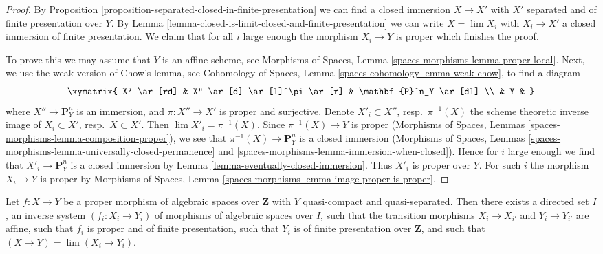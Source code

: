 \begin{proof}
By Proposition \ref{proposition-separated-closed-in-finite-presentation}
we can find a closed immersion $X \to X'$ with $X'$ separated and of
finite presentation over $Y$. By
Lemma \ref{lemma-closed-is-limit-closed-and-finite-presentation}
we can write $X = \lim X_i$ with $X_i \to X'$ a closed immersion of
finite presentation. We claim that for all $i$ large enough
the morphism $X_i \to Y$ is proper which finishes the proof.

\medskip\noindent
To prove this we may assume that $Y$ is an affine scheme, see
Morphisms of Spaces, Lemma \ref{spaces-morphisms-lemma-proper-local}.
Next, we use the weak version of Chow's lemma, see
Cohomology of Spaces, Lemma \ref{spaces-cohomology-lemma-weak-chow},
to find a diagram
$$
\xymatrix{
X' \ar[rd] & X'' \ar[d] \ar[l]^\pi \ar[r] & \mathbf{P}^n_Y \ar[dl] \\
& Y &
}
$$
where $X'' \to \mathbf{P}^n_Y$ is an immersion, and
$\pi : X'' \to X'$ is proper and surjective. Denote
$X'_i \subset X''$, resp.\ $\pi^{-1}(X)$ the scheme theoretic inverse image of
$X_i \subset X'$, resp.\ $X \subset X'$.
Then $\lim X'_i = \pi^{-1}(X)$. Since $\pi^{-1}(X) \to Y$ is proper
(Morphisms of Spaces, Lemmas \ref{spaces-morphisms-lemma-composition-proper}),
we see that $\pi^{-1}(X) \to \mathbf{P}^n_Y$ is a closed immersion
(Morphisms of Spaces, Lemmas
\ref{spaces-morphisms-lemma-universally-closed-permanence} and
\ref{spaces-morphisms-lemma-immersion-when-closed}).
Hence for $i$ large enough
we find that $X'_i \to \mathbf{P}^n_Y$ is a closed immersion by
Lemma \ref{lemma-eventually-closed-immersion}.
Thus $X'_i$ is proper over $Y$.
For such $i$ the morphism $X_i \to Y$ is proper by
Morphisms of Spaces, Lemma \ref{spaces-morphisms-lemma-image-proper-is-proper}.
\end{proof}

\begin{lemma}
\label{lemma-proper-limit-of-proper-finite-presentation-noetherian}
Let $f : X \to Y$ be a proper morphism of algebraic spaces over $\mathbf{Z}$
with $Y$ quasi-compact and quasi-separated. Then there exists a directed
set $I$, an inverse system $(f_i : X_i \to Y_i)$ of morphisms of algebraic
spaces over $I$, such that the transition morphisms $X_i \to X_{i'}$
and $Y_i \to Y_{i'}$ are affine, such that $f_i$ is proper and of
finite presentation, such that $Y_i$ is of finite presentation over
$\mathbf{Z}$, and such that $(X \to Y) = \lim (X_i \to Y_i)$.
\end{lemma}

